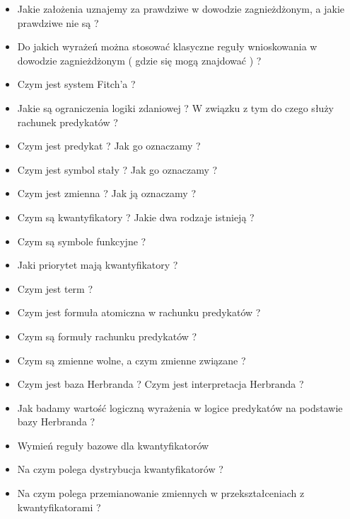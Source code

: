 \documentclass[a4paper,15pt]{article}
\begin{document}
\begin{itemize}
\item Jakie założenia uznajemy za prawdziwe w dowodzie zagnieżdżonym, a jakie prawdziwe nie są ?

\item Do jakich wyrażeń można stosować klasyczne reguły wnioskowania w dowodzie zagnieżdżonym ( gdzie się mogą znajdować ) ?

\item Czym jest system Fitch'a ?

\item Jakie są ograniczenia logiki zdaniowej ? W związku z tym do czego służy rachunek predykatów ?

\item Czym jest predykat ? Jak go oznaczamy ?

\item Czym jest symbol stały ? Jak go oznaczamy ?

\item Czym jest zmienna ? Jak ją oznaczamy ?

\item Czym są kwantyfikatory ? Jakie dwa rodzaje istnieją ?

\item Czym są symbole funkcyjne ?

\item Jaki priorytet mają kwantyfikatory ?

\item Czym jest term ?

\item Czym jest formuła atomiczna w rachunku predykatów ?

\item Czym są formuły rachunku predykatów ?

\item Czym są zmienne wolne, a czym zmienne związane ?

\item Czym jest baza Herbranda ? Czym jest interpretacja Herbranda ? 

\item Jak badamy wartość logiczną wyrażenia w logice predykatów na podstawie bazy Herbranda ?

\item Wymień reguły bazowe dla kwantyfikatorów

\item Na czym polega dystrybucja kwantyfikatorów ?

\item Na czym polega przemianowanie zmiennych w przekształceniach z kwantyfikatorami ?


\end{itemize}
\end{document}
